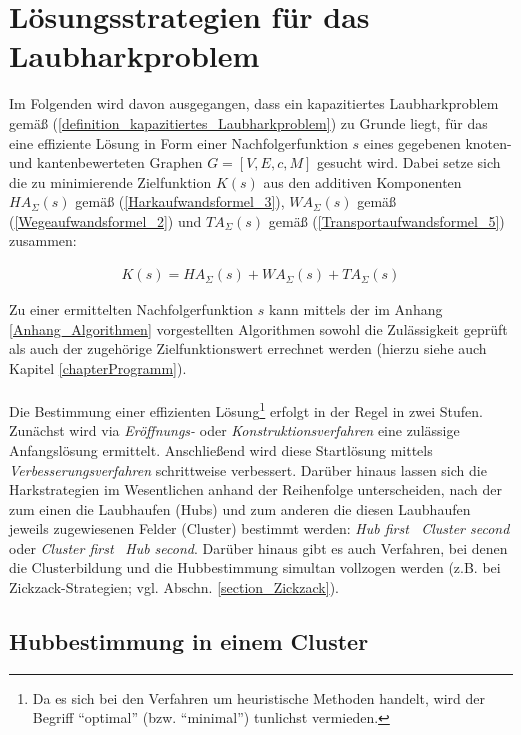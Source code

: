 \documentclass[fontsize=12pt,doubleside,openany,listof=totoc,listof=flat,listof=nochaptergap,numbers=noenddot]{scrbook}
\theoremstyle{style}
\begin{document}
\newpage
\chapter{Lösungsstrategien für das Laubharkproblem}
\label{chapterLösungsstrategien}

Im Folgenden wird davon ausgegangen, dass ein kapazitiertes Laubharkproblem gemäß (\ref{definition_kapazitiertes_Laubharkproblem}) zu Grunde liegt, für das eine effiziente Lösung in Form einer Nachfolgerfunktion $s$ eines gegebenen knoten- und kantenbewerteten Graphen $G=[V,E,c,M]$ gesucht wird. Dabei setze sich die zu minimierende Zielfunktion $K(s)$ aus den additiven Komponenten $HA_\Sigma(s)$ gemäß (\ref{Harkaufwandsformel_3}),  $WA_\Sigma(s)$ gemäß (\ref{Wegeaufwandsformel_2}) und $TA_\Sigma(s)$ gemäß (\ref{Transportaufwandsformel_5}) zusammen:

\begin{align}
K(s) = HA_\Sigma(s) + WA_\Sigma(s) + TA_\Sigma(s)
\label{definition_Gesamtzielfunktion}
\end{align} 

\noindent Zu einer ermittelten Nachfolgerfunktion $s$ kann mittels der im Anhang \ref{Anhang_Algorithmen} vorgestellten Algorithmen sowohl die Zulässigkeit geprüft als auch der zugehörige Zielfunktionswert errechnet werden (hierzu siehe auch Kapitel \ref{chapterProgramm}).\\ 
\\
Die Bestimmung einer effizienten Lösung\footnote{Da es sich bei den Verfahren um heuristische Methoden handelt, wird der Begriff "`optimal"' (bzw. "`minimal"') tunlichst vermieden.} erfolgt in der Regel in zwei Stufen. Zunächst wird via \textit{Eröffnungs-} oder \textit{Konstruktionsverfahren} eine zulässige Anfangslösung ermittelt. Anschließend wird diese Startlösung mittels \textit{Verbesserungsverfahren} schrittweise verbessert. Darüber hinaus lassen sich die Harkstrategien im Wesentlichen anhand der Reihenfolge unterscheiden, nach der zum einen die Laubhaufen (Hubs) und zum anderen die diesen Laubhaufen jeweils zugewiesenen Felder (Cluster) bestimmt werden: \textit{Hub first \textendash \, Cluster second} oder \textit{Cluster first} \textendash \, \textit{Hub second}. Darüber hinaus gibt es auch Verfahren, bei denen die Clusterbildung und die Hubbestimmung simultan vollzogen werden (z.B. bei Zickzack-Strategien; vgl. Abschn. \ref{section_Zickzack}).

\section{Hubbestimmung in einem Cluster}
\label{section_Cluster}
\end{document}

